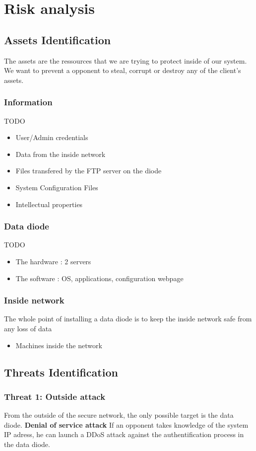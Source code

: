 \documentclass[a4paper,11pt]{article}
\begin{document}
\section{Risk analysis}
\subsection{Assets Identification}
The assets are the ressources that we are trying to protect inside of our system. We want to prevent a opponent to steal, corrupt or destroy any of the client's assets.
\subsubsection{Information}
TODO
\begin{itemize}
\item User/Admin credentials
\item Data from the inside network
\item Files transfered by the FTP server on the diode
\item System Configuration Files
\item Intellectual properties
\end{itemize}

\subsubsection{Data diode}
TODO
\begin{itemize}
\item The hardware : 2 servers
\item The software : OS, applications, configuration webpage
\end{itemize}
\subsubsection{Inside network}
The whole point of installing a data diode is to keep the inside network safe from any loss of data
\begin{itemize}
\item Machines inside the network
\end{itemize}
\subsection{Threats Identification}

\subsubsection{Threat 1: Outside attack}
From the outside of the secure network, the only possible target is the data diode. 
\textbf{Denial of service attack} If an opponent takes knowledge of the system IP adress, he can launch a DDoS attack against the authentification process in the data diode.  \\
\end{document}
